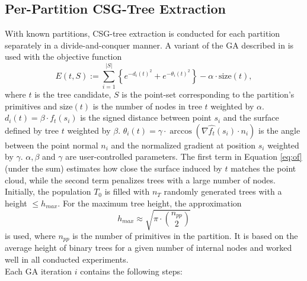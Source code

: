 \subsection{Per-Partition \ac{CSG}-Tree Extraction}
\label{ch:ga}
With known partitions, \ac{CSG}-tree extraction is conducted for each partition separately in a divide-and-conquer manner.
A variant of the \ac{GA} described in \cite{fayolle2016evolutionary} is used with the objective function
\begin{equation}
\label{eq:of}
E(t, S) := \sum_{i=1}^{|S|}\left\{e^{-d_i(t)^2}+e^{-\theta_i(t)^2}\right\}-\alpha \cdot \text{size}(t),
\end{equation}
where $t$ is the tree candidate, $S$ is the point-set corresponding to the partition's primitives and $\text{size}(t)$ is the number of nodes in tree $t$ weighted by $\alpha$.
$d_i(t) = \beta \cdot f_t(s_i)$ is the signed distance between point $s_i$ and the surface defined by tree $t$ weighted by $\beta$.
$\theta_i(t) = \gamma \cdot  \arccos(\nabla \hat{f_t}(s_i) \cdot n_i)$ is the angle between the point normal $n_i$ and the normalized gradient at position $s_i$ weighted by $\gamma$.  
$\alpha, \beta$ and $\gamma$ are user-controlled parameters. 
The first term in Equation \ref{eq:of} (under the sum) estimates how close the surface induced by $t$ matches the point cloud, while the second term penalizes trees with a large number of nodes.
\\
Initially, the population $T_0$ is filled with $n_T$ randomly generated trees with a height $\le h_{max}$. 
For the maximum tree height, the approximation  
\begin{equation}
h_{max}\approx \sqrt{\pi \cdot \binom{n_{pp}}{2}}
\end{equation}
is used, where $n_{pp}$ is the number of primitives in the partition.
It is based on the average height of binary trees for a given number of internal nodes \cite{flajolet1982TheAH} and worked well in all conducted experiments. 
\\
Each \ac{GA} iteration $i$ contains the following steps:
